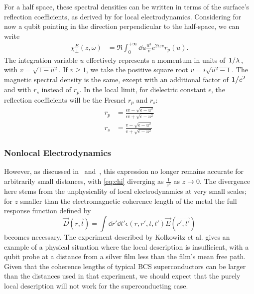 \documentclass[%
 preprint,
 amsmath,amssymb,
 aps,
]{revtex4-2}
\begin{document}
For a half space, these spectral densities can be written in terms of the surface's reflection coefficients, as derived by\cite{Henkel1999} for local electrodynamics.
Considering for now a qubit pointing in the direction perpendicular to the half-space, we can write
\begin{align}
	\chi_\perp^E(z, \omega) &= \Re \int_0^{+\infty} \dd{u} \frac{u^3}{v} e^{2 i z v} r_p(u). \label{eq:chi}
\end{align}
The integration variable $u$ effectively represents a momentum in units of $\flatfrac{1}{\lambda}$, with $v = \sqrt{1 - u^2}$.
If $v \geq 1$, we take the positive square root $v = i \sqrt{u^2 - 1}$.
The magnetic spectral density is the same, except with an additional factor of $\flatfrac{1}{c^2}$ and with $r_s$ instead of $r_p$.
In the local limit, for dielectric constant $\epsilon$, the reflection coefficients will be the Fresnel $r_p$ and $r_s$:
\begin{align}
	r_p &= \frac{\epsilon v - \sqrt{\epsilon - u^2}}{\epsilon v + \sqrt{\epsilon - u^2}} \\
	r_s &= \frac{v - \sqrt{\epsilon - u^2}}{ v + \sqrt{\epsilon - u^2}}
\end{align}

\subsubsection{Nonlocal Electrodynamics} \label{subsubsec:nonlocalelectrodynamics}
However, as discussed in~\cite{QubitRelax} and~\cite{Henkel2006}, this expression no longer remains accurate for arbitrarily small distances, with \eqref{eq:chi} diverging as $\frac{1}{z^3}$ as $z \rightarrow 0$.
The divergence here stems from the unphysicality of local electrodynamics at very small scales;
for $z$ smaller than the electromagnetic coherence length of the metal the full response function defined by
\begin{equation}
	\vec{D}(\vec{r, t}) = \int \dd{r'} \dd{t'} \epsilon(r, r', t, t') \vec{E}(\vec{r', t'})
\end{equation}
becomes necessary.
The experiment described by Kolkowitz et al.\cite{Kolkowitz2015} gives an example of a physical situation where the local description is insufficient, with a qubit probe at a distance from a silver film less than the film's mean free path.
Given that the coherence lengths of typical BCS superconductors can be larger than the distances used in that experiment, we should expect that the purely local description will not work for the superconducting case.
\end{document}
